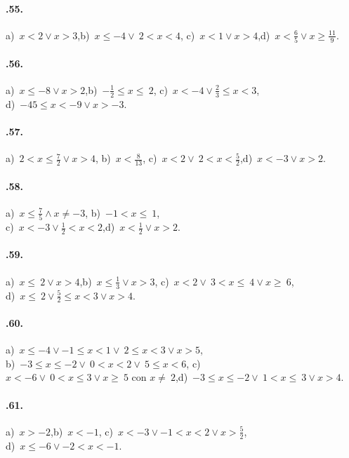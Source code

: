 \begin{multicols}{2}
\paragraph{\thechapter.55.} a)~$x<2\vee x>3$,\quad b)~$x\le -4\vee~2<x<4$,\quad
c)~$x<1\vee x>4$,\quad d)~$x<\frac{6}{5}\vee x\ge\frac{11}{9}$.

\paragraph{\thechapter.56.} a)~$x\le -8\vee x>2$,\quad b)~$-{\frac{1}{2}}\le x\le~2$,\quad
c)~$x<-4\vee\frac{2}{3}\le x<3$,\quad \protect\\ d)~$-45\le x<-9\vee x>-3$.

\paragraph{\thechapter.57.} a)~$2<x\le \frac{7}{2}\vee x>4$,\quad
b)~$x<\frac{8}{13}$,\quad
c)~$x<2\vee~2<x<\frac{5}{2}$,\quad d)~$x<-3\vee x>2$.

\paragraph{\thechapter.58.} a)~$x\le \frac{7}{5}\wedge x\neq-3$,\quad
b)~$-1<x\le~1$,\quad
\protect\\ c)~$x<-3\vee\frac{1}{2}<x<2$,\quad d)~$x<\frac{1}{2}\vee x>2$.

\paragraph{\thechapter.59.} a)~$x\le~2\vee x>4$,\quad b)~$x\le \frac{1}{3}\vee x>3$,\quad
c)~$x<2\vee~3<x\le~4\vee x\ge~6$,\quad \protect\\ d)~$x\le~2\vee \frac{5}{2}\le x<3\vee x>4$.
\end{multicols}
\paragraph{\thechapter.60.} a)~$x\le -4\vee -1\le x<1\vee~2\le x<3\vee x>5$,\quad
\protect\\ b)~$-3\le x\le -2\vee~0<x<2\vee~5\le x<6$,\quad
c)~$x<-6\vee~0<x\le3\vee x\ge~5\text{ con }x\neq~2$,\quad d)~$-3\le x\le -2\vee~1<x\le~3\vee x>4$.

\paragraph{\thechapter.61.} a)~$x>-2$,\quad b)~$x<-1$,\quad
c)~$x<-3\vee -1<x<2\vee x>\frac{5}{2}$,\quad
\protect\\ d)~$x\le -6\vee -2<x<-1$.

